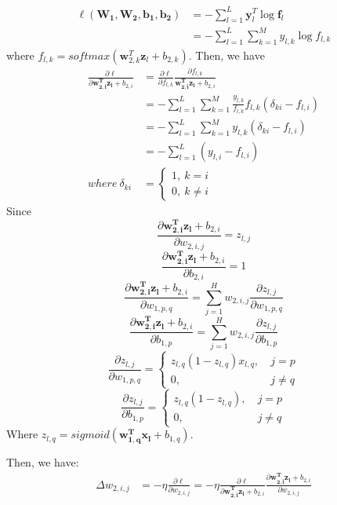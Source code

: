 \documentclass{article}
\renewcommand{\b}[1]{\bm{#1}}
\begin{document}
\begin{enumerate}
\begin{align*}
        \ell(\b{W_1,W_2,b_1,b_2}) &= -\sum_{l=1}^L\b{y}_l^T\log{\b{f}_l}\\
        &= -\sum_{l=1}^L\sum_{k=1}^My_{l,k}\log{f_{l,k}}
    \end{align*}
    where $f_{l,k}=softmax(\b{w}_{2,k}^T\b{z}_l+b_{2,k})$.
    Then, we have
    \begin{align*}
        \frac{\partial \ell}{\partial \b{w_{2,i}^Tz_l}+b_{2,i}} 
        &= \frac{\partial \ell}{\partial f_{l,k}}\frac{\partial f_{l,k}}{\b{w_{2,i}^Tz_l}+b_{2,i}}\\
        &= -\sum_{l=1}^L\sum_{k=1}^M\frac{y_{l,k}}{f_{l,k}}f_{l,k}(\delta_{ki}-f_{l,i})\\ 
        &= -\sum_{l=1}^L\sum_{k=1}^My_{l,k}(\delta_{ki}-f_{l,i})\\
        &= -\sum_{l=1}^L(y_{l,i}-f_{l,i})\\
        where\ \delta_{ki} &=\left\{\begin{aligned}
            1,\ k=i\\
            0,\ k\neq i
        \end{aligned}\right.
    \end{align*}
    Since 
    \[\frac{\partial \b{w_{2,i}^Tz_l}+b_{2,i}}{\partial w_{2,i,j}} = z_{l,j}\]
    \[\frac{\partial \b{w_{2,i}^Tz_l}+b_{2,i}}{\partial b_{2,i}} = 1\]
    \[\frac{\partial \b{w_{2,i}^Tz_l}+b_{2,i}}{\partial w_{1,p,q}} 
    = \sum_{j=1}^H w_{2,i,j}\frac{\partial z_{l,j}}{\partial w_{1,p,q}}\]
    \[\frac{\partial \b{w_{2,i}^Tz_l}+b_{2,i}}{\partial b_{1,p}}
    = \sum_{j=1}^H w_{2,i,j}\frac{\partial z_{l,j}}{\partial b_{1,p}}\]
    \[\frac{\partial z_{l,j}}{\partial w_{1,p,q}}
    = \left\{\begin{aligned}
         z_{l,q}(1-z_{l,q})x_{l,q},\ &j=p\\
         0,\ &j\neq q
    \end{aligned}\right.\]
    \[\frac{\partial z_{l,j}}{\partial b_{1,p}}
    = \left\{\begin{aligned}
        z_{l,q}(1-z_{l,q}),\ &j=p\\
        0,\ &j\neq q
    \end{aligned}\right.\]
    Where $z_{l,q}=sigmoid(\b{w_{1,q}^Tx_l}+b_{1,q})$.
    \par Then, we have:
    \begin{align*}
        \Delta w_{2,i,j}
        &= -\eta\frac{\partial \ell}{\partial w_{2,i,j}}
        = -\eta\frac{\partial \ell}{\partial \b{w_{2,i}^Tz_l}+b_{2,i}}\frac{\partial \b{w_{2,i}^Tz_l}+b_{2,i}}{\partial w_{2,i,j}}\\

\end{align*}
\end{enumerate}
\end{document}
